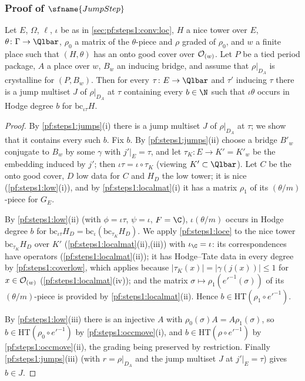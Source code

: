 \subsubsection{Proof of $\sfname{JumpStep}$}

\begin{theorem}\label{pf:steps1:jumpcore}
Let $E$, $\Omega$, $\ell$, $\iota$ be as in \cref{sec:pf:steps1:conv:loc}, $H$ a nice tower over $E$, $\theta\colon\Gamma\to\Qlbar$,
$\rho_0$ a matrix of the $\theta$-piece and $\rho$ graded of $\rho_0$, and $w$ a finite place such that $(H,\theta)$ has an onto good
cover over $\mathcal{O}_{(w)}$. Let $P$ be a tied period package, $A$ a place over $w$, $B_w$ an inducing bridge, and assume that
$\rho|_{D_A}$ is crystalline for $(P,B_w)$. Then for every $\tau\colon E\to\Qlbar$ and $\tau'$ inducing $\tau$ there is a jump
multiset $J$ of $\rho|_{D_A}$ at $\tau$ containing every $b\in\N$ such that $\iota\theta$ occurs in Hodge degree $b$ for
$\mathrm{bc}_{\iota\tau}H$. 
\end{theorem}

\begin{proof}
By \cref{pf:steps1:jumps}(i) there is a jump multiset $J$ of $\rho|_{D_A}$ at $\tau$; we show that it contains every such $b$.
Fix $b$. By \cref{pf:steps1:jumps}(ii) choose a bridge $B'_w$ conjugate to $B_w$ by some $\gamma$ with $j'|_E=\tau$, and let
$\tau_K\colon E\to K'=K'_w$ be the embedding induced by $j'$; then $\iota\tau=\iota\circ\tau_K$ (viewing $K'\subset\Qlbar$).
Let $C$ be the onto good cover, $D$ low data for $C$ and $H_D$ the low tower; it is nice (\cref{pf:steps1:low}(i)), and by
\cref{pf:steps1:localmat}(i) it has a matrix $\rho_1$ of its $(\theta/m)$-piece for $G_E$.

By \cref{pf:steps1:low}(ii) (with $\phi=\iota\tau$, $\psi=\iota$, $F=\C$), $\iota(\theta/m)$ occurs in Hodge degree $b$ for
$\mathrm{bc}_{\iota\tau}H_D=\mathrm{bc}_{\iota}(\mathrm{bc}_{\tau_K}H_D)$. We apply \cref{pf:steps1:loce} to the nice tower
$\mathrm{bc}_{\tau_K}H_D$ over $K'$ (\cref{pf:steps1:localmat}(ii),(iii)) with $\iota_{\C}=\iota$: its correspondences have
operators (\cref{pf:steps1:localmat}(ii)); it has Hodge--Tate data in every degree by \cref{pf:steps1:coverlow}, which applies
because $|\tau_K(x)|=|\gamma(j(x))|\le1$ for $x\in\mathcal{O}_{(w)}$ (\cref{pf:steps1:localmat}(iv)); and the matrix
$\sigma\mapsto\rho_1(e'^{-1}(\sigma))$ of its $(\theta/m)$-piece is provided by \cref{pf:steps1:localmat}(ii). Hence
$b\in\mathrm{HT}(\rho_1\circ e'^{-1})$.

By \cref{pf:steps1:low}(iii) there is an injective $A$ with $\rho_0(\sigma)A=A\rho_1(\sigma)$, so $b\in\mathrm{HT}(\rho_0\circ e'^{-1})$
by \cref{pf:steps1:occmove}(i), and $b\in\mathrm{HT}(\rho\circ e'^{-1})$ by \cref{pf:steps1:occmove}(ii), the grading being preserved by
restriction. Finally \cref{pf:steps1:jumps}(iii) (with $r=\rho|_{D_A}$ and the jump multiset $J$ at $j'|_E=\tau$) gives $b\in J$.
\end{proof}

